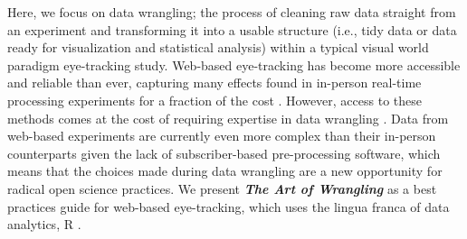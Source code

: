 Here, we focus on data wrangling; the process of cleaning raw data straight from an experiment and transforming it into a usable structure (i.e., tidy data or data ready for visualization and statistical analysis) within a typical visual world paradigm eye-tracking study. Web-based eye-tracking has become more accessible and reliable than ever, capturing many effects found in in-person real-time processing experiments for a fraction of the cost \parencite[e.g.,][]{Vos_2017,Semmelmann_2017,Prystauka_Altmann_Rothman_2023,Degen_Seeing_2021}. However, access to these methods comes at the cost of requiring expertise in data wrangling \parencite[e.g., ][]{Vos_2017,Prystauka_Altmann_Rothman_2023}. Data from web-based experiments are currently even more complex than their in-person counterparts given the lack of subscriber-based pre-processing software, which means that the choices made during data wrangling are a new opportunity for radical open science practices. We present \textit{\textbf{The Art of Wrangling}} as a best practices guide for web-based eye-tracking, which uses the lingua franca of data analytics, R \parencite{mizumoto_r_2015, R}. 
